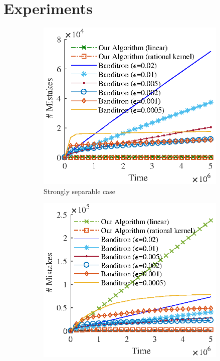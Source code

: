  \section{Experiments}
\label{sec:experiments}
\begin{figure}
    \centering
    \begin{subfigure}[b]{0.23\textwidth} 
        \captionsetup{justification=centering}
        \begin{center}
        \hspace*{-0.3cm} \includegraphics[width=1.15\textwidth, trim={0, 0.1cm, 0, 0}, clip]{figures/strong3}
        \caption{Strongly separable case}
        \end{center}
    \end{subfigure}
    \hfill
    \begin{subfigure}[b]{0.23\textwidth} 
        \captionsetup{justification=centering}
        \centering
        \hspace*{-0.3cm}  \includegraphics[width=1.15\textwidth, trim={0, 0.1cm, 0, 0}, clip]{figures/weak3}

\end{subfigure}
\end{figure}
